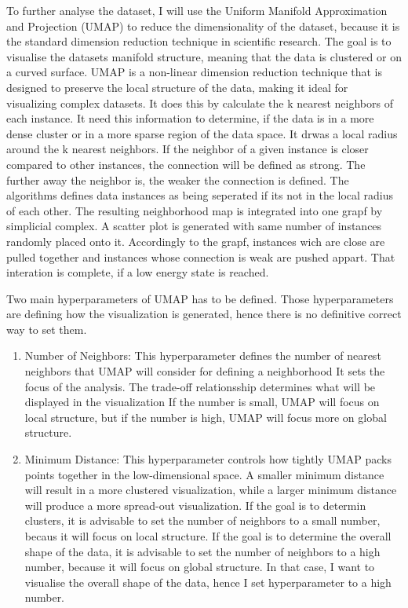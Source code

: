 To further analyse the dataset, I will use the Uniform Manifold Approximation and Projection (UMAP) to reduce the dimensionality of the dataset, because it is the standard dimension reduction technique in scientific research.
The goal is to visualise the datasets manifold structure, meaning that the data is clustered or on a curved surface.
UMAP is a non-linear dimension reduction technique that is designed to preserve the local structure of the data, making it ideal for visualizing complex datasets.
It does this by calculate the k nearest neighbors of each instance.
It need this information to determine, if the data is in a more dense cluster or in a more sparse region of the data space.
It drwas a local radius around the k nearest neighbors.
If the neighbor of a given instance is closer compared to other instances, the connection will be defined as strong.
The further away the neighbor is, the weaker the connection is defined. 
The algorithms defines data instances as being seperated if its not in the local radius of each other.
The resulting neighborhood map is integrated into one grapf by simplicial complex.
A scatter plot is generated with same number of instances randomly placed onto it.
Accordingly to the grapf, instances wich are close are pulled together and instances whose connection is weak are pushed appart.
That interation is complete, if a low energy state is reached.

Two main hyperparameters of UMAP has to be defined. 
Those hyperparameters are defining how the visualization is generated, hence there is no definitive correct way to set them.

\begin{enumerate}
  \item Number of Neighbors: This hyperparameter defines the number of nearest neighbors that UMAP will consider for defining a neighborhood
    It sets the focus of the analysis. The trade-off relationsship determines what will be displayed in the visualization 
    If the number is small, UMAP will focus on local structure, but if the number is high, UMAP will focus more on global structure.
   \item Minimum Distance: This hyperparameter controls how tightly UMAP packs points together in the low-dimensional space. 
    A smaller minimum distance will result in a more clustered visualization, while a larger minimum distance will produce a more spread-out visualization.
    If the goal is to determin clusters, it is advisable to set the number of neighbors to a small number, becaus it will focus on local structure. 
    If the goal is to determine the overall shape of the data, it is advisable to set the number of neighbors to a high number, because it will focus on global structure.
    In that case, I want to visualise the overall shape of the data, hence I set hyperparameter to a high number.
\end{enumerate}

